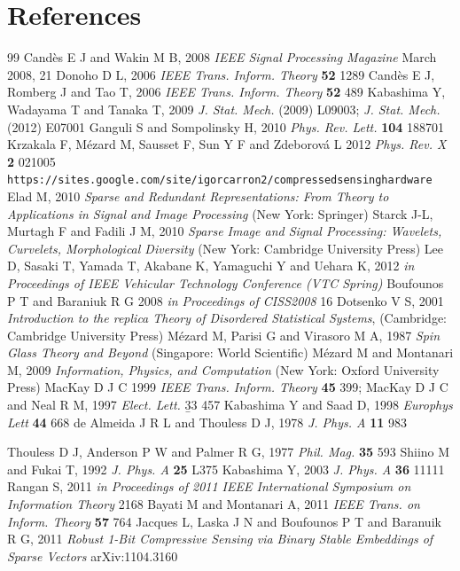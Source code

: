 \documentclass[12pt]{iopart}
\begin{document}
\section*{References}
\begin{thebibliography}{99}
Cand\`{e}s E J and Wakin M B, 2008 {\em IEEE Signal Processing Magazine} March 2008, 21 
Donoho D L, 2006 {\em IEEE Trans. Inform. Theory} {\bf 52} 1289
Cand\`{e}s E J, Romberg J and Tao T, 2006  {\em IEEE Trans. Inform. Theory} {\bf 52} 489
Kabashima Y, Wadayama T and Tanaka T, 2009 
{\em J. Stat. Mech. } (2009) L09003; {\em J. Stat. Mech.} (2012) E07001 
Ganguli S and Sompolinsky H, 2010 {\em Phys. Rev. Lett.} {\bf 104} 188701
Krzakala F, M\'{e}zard M, Sausset F, Sun Y F and Zdeborov\'{a} L 2012 {\em Phys. Rev. X} {\bf 2} 021005
\texttt{https://sites.google.com/site/igorcarron2/compressedsensinghardware}
Elad M, 2010 {\em Sparse and Redundant Representations: From Theory to Applications in Signal and Image Processing}
(New York: Springer)
Starck J-L, Murtagh F and Fadili J M, 2010 {\em Sparse Image and Signal Processing: Wavelets, Curvelets, Morphological Diversity}
(New York: Cambridge University Press)  
Lee D, Sasaki T, Yamada T,  Akabane K, Yamaguchi Y and Uehara K, 2012
{\em in Proceedings of IEEE Vehicular Technology Conference (VTC Spring)}
 Boufounos P T  and Baraniuk R G 2008 
{\em in Proceedings of CISS2008} 16 
 Dotsenko V S, 2001 {\it Introduction to the replica Theory of Disordered Statistical Systems}, (Cambridge: Cambridge University Press)
 M\'{e}zard M, Parisi G and Virasoro M A, 1987 {\em Spin Glass Theory and Beyond} (Singapore: World Scientific)
 M\'{e}zard M and Montanari M, 2009 {\em Information, Physics, and Computation}
(New York: Oxford University Press)
MacKay D J C 1999 {\em IEEE Trans. Inform. Theory} {\bf 45} 399; MacKay D J C and Neal R M, 1997 {\em Elect. Lett.} {\b 33} 457 
Kabashima Y and Saad D, 1998 {\em Europhys Lett} {\bf 44} 668
 de Almeida J R L and Thouless D J, 1978 {\em J. Phys. A} {\bf 11} 983

 Thouless D J, Anderson P W and Palmer R G, 1977
{\em Phil. Mag.} {\bf 35} 593
 Shiino M and Fukai T, 1992
{\em J. Phys. A} {\bf 25} L375 
Kabashima Y, 2003 {\em J. Phys. A} {\bf 36} 11111
Rangan S, 2011 {\em in Proceedings of 2011 IEEE International Symposium on Information Theory} 2168
Bayati M and Montanari A, 2011 {\em IEEE Trans. on Inform. Theory} {\bf 57} 764
 Jacques L, Laska J N and Boufounos P T and Baranuik R G, 2011 {\em Robust 1-Bit Compressive Sensing via Binary Stable Embeddings of Sparse Vectors} arXiv:1104.3160

\end{thebibliography}
\end{document}
